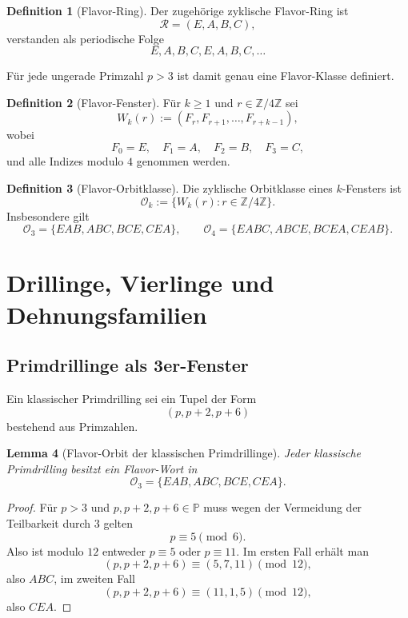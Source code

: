 \documentclass[11pt,a4paper]{article}
\theoremstyle{definition}
\newtheorem{definition}{Definition}[section]
\theoremstyle{plain}
\newtheorem{lemma}[definition]{Lemma}
\begin{document}
	\begin{definition}[Flavor-Ring]
		Der zugehörige zyklische Flavor-Ring ist
		\[
		\mathcal R=(E,A,B,C),
		\]
		verstanden als periodische Folge
		\[
		E,A,B,C,E,A,B,C,\dots
		\]
	\end{definition}
	
	Für jede ungerade Primzahl $p>3$ ist damit genau eine Flavor-Klasse definiert.
	
	\begin{definition}[Flavor-Fenster]
		Für $k\ge 1$ und $r\in\mathbb Z/4\mathbb Z$ sei
		\[
		W_k(r):=(F_r,F_{r+1},\dots,F_{r+k-1}),
		\]
		wobei
		\[
		F_0=E,\quad F_1=A,\quad F_2=B,\quad F_3=C,
		\]
		und alle Indizes modulo $4$ genommen werden.
	\end{definition}
	
	\begin{definition}[Flavor-Orbitklasse]
		Die zyklische Orbitklasse eines $k$-Fensters ist
		\[
		\mathcal O_k:=\{W_k(r):r\in\mathbb Z/4\mathbb Z\}.
		\]
		Insbesondere gilt
		\[
		\mathcal O_3=\{EAB,ABC,BCE,CEA\},
		\qquad
		\mathcal O_4=\{EABC,ABCE,BCEA,CEAB\}.
		\]
	\end{definition}
	
	\section{Drillinge, Vierlinge und Dehnungsfamilien}
	
	\subsection{Primdrillinge als 3er-Fenster}
	
	Ein klassischer Primdrilling sei ein Tupel der Form
	\[
	(p,p+2,p+6)
	\]
	bestehend aus Primzahlen.
	
	\begin{lemma}[Flavor-Orbit der klassischen Primdrillinge]
		Jeder klassische Primdrilling besitzt ein Flavor-Wort in
		\[
		\mathcal O_3=\{EAB,ABC,BCE,CEA\}.
		\]
	\end{lemma}
	
	\begin{proof}
		Für $p>3$ und $p,p+2,p+6\in\mathbb P$ muss wegen der Vermeidung der Teilbarkeit durch $3$ gelten
		\[
		p\equiv 5\pmod 6.
		\]
		Also ist modulo $12$ entweder $p\equiv 5$ oder $p\equiv 11$. Im ersten Fall erhält man
		\[
		(p,p+2,p+6)\equiv(5,7,11)\pmod{12},
		\]
		also $ABC$, im zweiten Fall
		\[
		(p,p+2,p+6)\equiv(11,1,5)\pmod{12},
		\]
		also $CEA$.
	\end{proof}
	
\end{document}
